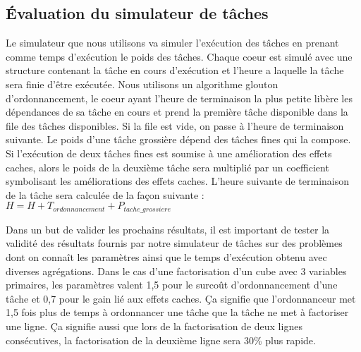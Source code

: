 \subsection{\'Evaluation du simulateur de tâches}
Le simulateur que nous utilisons va simuler l'exécution des tâches en prenant comme temps d'exécution le poids des tâches.
%
Chaque coeur est simulé avec une structure contenant la tâche en cours d'exécution et l'heure a laquelle la tâche sera finie d'être exécutée.
%
Nous utilisons un algorithme glouton d'ordonnancement, le coeur ayant l'heure de terminaison la plus petite libère les dépendances de sa tâche en cours et prend la première tâche disponible dans la file des tâches disponibles.
%
Si la file est vide, on passe à l'heure de terminaison suivante.
%
Le poids d'une tâche grossière dépend des tâches fines qui la compose.
%
Si l'exécution de deux tâches fines est soumise à une amélioration des effets caches, alors le poids de la deuxième tâche sera multiplié par un coefficient symbolisant les améliorations des effets caches.
%
L'heure suivante de terminaison de la tâche sera calculée de la façon suivante : $H = H + T_{ordonnancement} + P_{tache\_grossiere}$

Dans un but de valider les prochains résultats, il est important de tester la validité des résultats fournis par notre simulateur de tâches sur des problèmes dont on connaît les paramètres ainsi que le temps d'exécution obtenu avec diverses agrégations.
%
Dans le cas d'une factorisation d'un cube avec 3 variables primaires, les paramètres valent 1,5 pour le surcoût d'ordonnancement d'une tâche et 0,7 pour le gain lié aux effets caches.
%
Ça signifie que l'ordonnanceur met 1,5 fois plus de temps à ordonnancer une tâche que la tâche ne met à factoriser une ligne.
%
Ça signifie aussi que lors de la factorisation de deux lignes consécutives, la factorisation de la deuxième ligne sera 30\% plus rapide.
